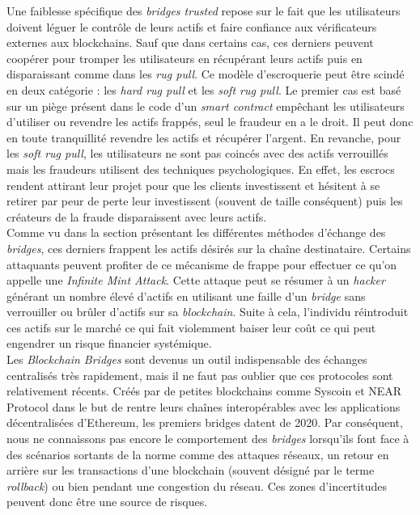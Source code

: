 Une faiblesse spécifique des \textit{bridges trusted} repose sur le fait que les utilisateurs doivent léguer le contrôle de leurs actifs et faire confiance aux vérificateurs externes aux blockchains. Sauf que dans certains cas, ces derniers peuvent coopérer pour tromper les utilisateurs en récupérant leurs actifs puis en disparaissant comme dans les \textit{rug pull}\cite{EthereumRisks}. Ce modèle d’escroquerie peut être scindé en deux catégorie : les \textit{hard rug pull} et les \textit{soft rug pull}\cite{Hacken}. Le premier cas est basé sur un piège présent dans le code d’un \textit{smart contract} empêchant les utilisateurs d’utiliser ou revendre les actifs frappés, seul le fraudeur en a le droit. Il peut donc en toute tranquillité revendre les actifs et récupérer l’argent. En revanche, pour les \textit{soft rug pull}, les utilisateurs ne sont pas coincés avec des actifs verrouillés mais les fraudeurs utilisent des techniques psychologiques. En effet, les escrocs rendent attirant leur projet pour que les clients investissent et hésitent à se retirer par peur de perte leur investissent (souvent de taille conséquent) puis les créateurs de la fraude disparaissent avec leurs actifs.\\

Comme vu dans la section présentant les différentes méthodes d’échange des \textit{bridges}, ces derniers frappent les actifs désirés sur la chaîne destinataire. Certains attaquants peuvent profiter de ce mécanisme de frappe pour effectuer ce qu’on appelle une \textit{Infinite Mint Attack}.\cite{ChainLinkRisks} Cette attaque peut se résumer à un \textit{hacker} générant un nombre élevé d’actifs en utilisant une faille d’un \textit{bridge} sans verrouiller ou brûler d’actifs sur sa \textit{blockchain}. Suite à cela, l’individu réintroduit ces actifs sur le marché ce qui fait violemment baiser leur coût ce qui peut engendrer un risque financier systémique.\\

Les \textit{Blockchain Bridges} sont devenus un outil indispensable des échanges centralisés très rapidement, mais il ne faut pas oublier que ces protocoles sont relativement récents. Créés par de petites blockchains comme Syscoin et NEAR Protocol dans le but de rentre leurs chaînes interopérables avec les applications décentralisées d’Ethereum, les premiers bridges datent de 2020\cite{Bitstamp}. Par conséquent, nous ne connaissons pas encore le comportement des \textit{bridges} lorsqu’ils font face à des scénarios sortants de la norme comme des attaques réseaux, un retour en arrière sur les transactions d’une blockchain (souvent désigné par le terme \textit{rollback}) ou bien pendant une congestion du réseau. Ces zones d’incertitudes peuvent donc être une source de risques. \\

